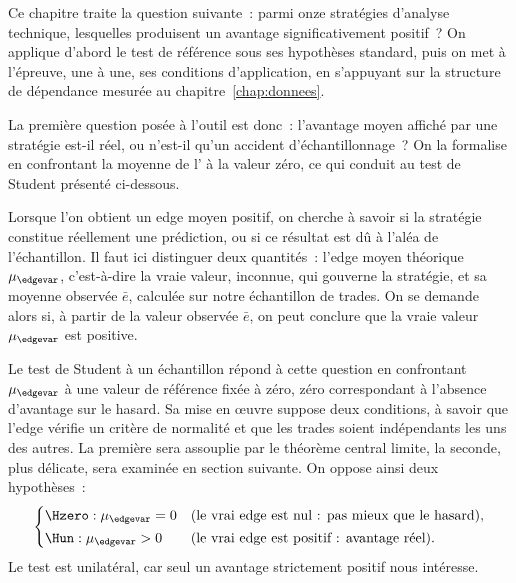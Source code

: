 

Ce chapitre traite la question suivante~: parmi onze stratégies
d'analyse technique, lesquelles produisent un avantage \edgevar{}
significativement positif~? On applique d'abord le test de référence
sous ses hypothèses standard, puis on met à l'épreuve, une à une, ses
conditions d'application, en s'appuyant sur la structure de dépendance
mesurée au chapitre~\ref{chap:donnees}.


La première question posée à l'outil est donc~: l'avantage moyen affiché
par une stratégie est-il réel, ou n'est-il qu'un accident
d'échantillonnage~? On la formalise en confrontant la moyenne de
l'\edgevar{} à la valeur zéro, ce qui conduit au test de Student
présenté ci-dessous.


Lorsque l'on obtient un edge moyen positif, on cherche à savoir si la
stratégie constitue réellement une prédiction, ou si ce résultat est dû
à l'aléa de l'échantillon. Il faut ici distinguer deux quantités~:
l'edge moyen théorique \(\mu_{\edgevar}\), c'est-à-dire la vraie valeur,
inconnue, qui gouverne la stratégie, et sa moyenne observée \(\bar e\),
calculée sur notre échantillon de trades. On se demande alors si, à
partir de la valeur observée \(\bar e\), on peut conclure que la vraie
valeur \(\mu_{\edgevar}\) est positive.

Le test de Student à un échantillon répond à cette question en
confrontant \(\mu_{\edgevar}\) à une valeur de référence fixée à zéro,
zéro correspondant à l'absence d'avantage sur le hasard. Sa mise en
\oe uvre suppose deux conditions, à savoir que l'edge vérifie un critère
de normalité et que les trades soient indépendants les uns des autres.
La première sera assouplie par le théorème central limite, la seconde,
plus délicate, sera examinée en section suivante. On oppose ainsi deux
hypothèses~:
\[
  \begin{cases}
    \Hzero : \mu_{\edgevar} = 0 & \text{(le vrai edge est nul~: pas mieux que le hasard),}\\[2pt]
    \Hun : \mu_{\edgevar} > 0 & \text{(le vrai edge est positif~: avantage réel).}
  \end{cases}
\]
Le test est unilatéral, car seul un avantage strictement positif nous
intéresse.

